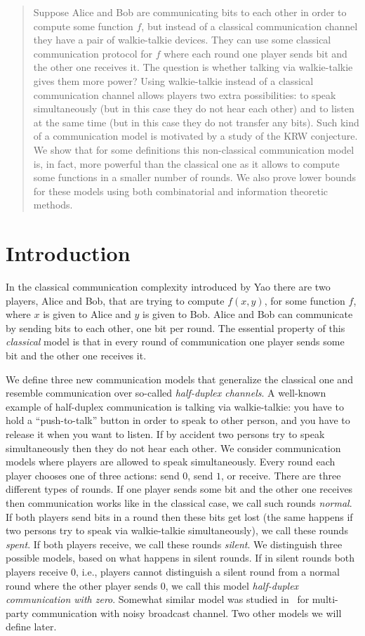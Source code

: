 \begin{abstract}
Suppose Alice and Bob are communicating bits to each other in order to compute some function $f$, but instead of a classical communication channel they have a pair of walkie-talkie devices. They can use some classical communication protocol for $f$ where each round one player sends bit and the other one receives it. The question is whether talking via walkie-talkie gives them more power? Using walkie-talkie instead of a classical communication channel allows players two extra possibilities: to speak simultaneously (but in this case they do not hear each other) and to listen at the same time (but in this case they do not transfer any bits). Such kind of a communication model is motivated by a study of the KRW conjecture. We show that for some definitions this non-classical communication model is, in fact, more powerful than the classical one as it allows to compute some functions in a smaller number of rounds. We also prove lower bounds for these models using both combinatorial and information theoretic methods.
\end{abstract}


\section{Introduction}
In the classical communication complexity introduced by Yao \cite{Yao79} there are two players,
Alice and Bob, that are trying to compute $f(x,y)$, for some function $f$, where $x$ is given to Alice and $y$ is given to Bob. Alice and Bob can communicate by sending bits to each other, one bit
per round. The essential property of this \emph{classical} model is that in every round of communication one player
sends some bit and the other one receives it.

We define three new communication models that generalize the classical one and resemble
communication over so-called \emph{half-duplex channels}.  A well-known example of half-duplex
communication is talking via walkie-talkie: you have to hold a ``push-to-talk'' button in order to speak 
to other person, and you have to release it when you want to listen. 
If by accident two persons try to speak simultaneously then they do not hear each other. 
We consider communication models where players are allowed to speak simultaneously. 
Every round each player chooses one of three
actions: send $0$, send $1$, or receive. There are three different types of rounds.
If one player sends some bit and the other one receives then
communication works like in the classical case, we call such rounds \emph{normal}. 
If both players send bits in a round then these bits get lost (the same happens if two persons try
to speak via walkie-talkie simultaneously), we call these rounds \emph{spent}. 
If both players receive, we call these rounds \emph{silent}. We distinguish three
possible models, based on what happens in silent rounds. If in silent rounds
both players receive $0$, i.e., players cannot distinguish a silent round from a normal round
where the other player sends $0$, we call this model \emph{half-duplex communication with zero}. Somewhat similar model was studied in~\cite{EKS17} for multi-party communication 
with noisy broadcast channel. Two other models we will define later.


